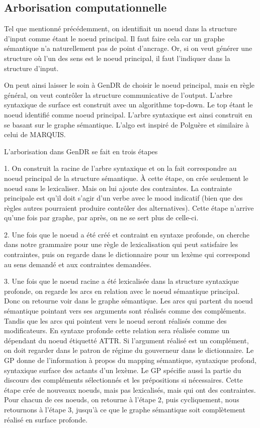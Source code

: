 \subsection{Arborisation computationnelle}

Tel que mentionné précédemment, on identifiait un noeud dans la structure d'input comme étant le noeud principal. Il faut faire cela car un graphe sémantique n'a naturellement pas de point d'ancrage. Or, si on veut générer une structure où l'un des sens est le noeud principal, il faut l'indiquer dans la structure d'input. 

On peut ainsi laisser le soin à GenDR de choisir le noeud principal, mais en règle général, on veut contrôler la structure communicative de l'output. L'arbre syntaxique de surface est construit avec un algorithme top-down. Le top étant le noeud identifié comme noeud principal. L'arbre syntaxique est ainsi construit en se basant sur le graphe sémantique. L'algo est inspiré de Polguère et similaire à celui de MARQUIS.

L'arborisation dans GenDR se fait en trois étapes

1. On construit la racine de l'arbre syntaxique et on la fait correspondre au noeud principal de la structure sémantique. À cette étape, on crée seulement le noeud sans le lexicaliser. Mais on lui ajoute des contraintes. La contrainte principale est qu'il doit s'agir d'un verbe avec le mood indicatif (bien que des règles autres pourraient produire contrôler des alternatives). Cette étape n'arrive qu'une fois par graphe, par après, on ne se sert plus de celle-ci.

2. Une fois que le noeud a été créé et contraint en syntaxe profonde, on cherche dans notre grammaire pour une règle de lexicalisation qui peut satisfaire les contraintes, puis on regarde dans le dictionnaire pour un lexème qui correspond au sens demandé et aux contraintes demandées.

3.	Une fois que le noeud racine a été lexicalisée dans la structure syntaxique profonde, on regarde les arcs en relation avec le noeud sémantique principal. Donc on retourne voir dans le graphe sémantique. Les arcs qui partent du noeud sémantique pointant vers ses arguments sont réalisés comme des compléments. Tandis que les arcs qui pointent vers le noeud seront réalisés comme des modificateurs. En syntaxe profonde cette relation sera réalisée comme un dépendant du noeud étiquetté ATTR. Si l'argument réalisé est un complément, on doit regarder dans le patron de régime du gouverneur dans le dictionnaire. Le GP donne de l'information à propos du mapping sémantique, syntaxique profond, syntaxique surface des actants d'un lexème. Le GP spécifie aussi la partie du discours des compléments sélectionnés et les prépositions si nécessaires. Cette étape crée de nouveaux noeuds, mais pas lexicalisés, mais qui ont des contraintes. Pour chacun de ces noeuds, on retourne à l'étape 2, puis cycliquement, nous retournons à l'étape 3,  jusqu'à ce que le graphe sémantique soit complètement réalisé en surface profonde.

